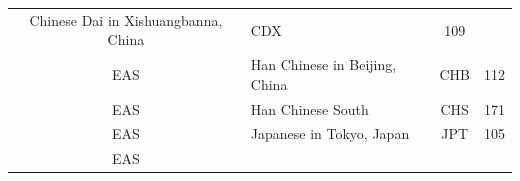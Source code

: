 \documentclass[]{book}
\theoremstyle{definition}
\theoremstyle{definition}
\theoremstyle{definition}
\theoremstyle{remark}
\begin{document}
\begin{longtable}[]{@{}clcc@{}}
\begin{minipage}[t]{0.59\columnwidth}
Chinese Dai in Xishuangbanna, China\strut
\end{minipage} & \begin{minipage}[t]{0.09\columnwidth}\centering\strut
CDX\strut
\end{minipage} & \begin{minipage}[t]{0.07\columnwidth}\centering\strut
109\strut
\end{minipage}\tabularnewline
\begin{minipage}[t]{0.14\columnwidth}\centering\strut
EAS\strut
\end{minipage} & \begin{minipage}[t]{0.59\columnwidth}\raggedright\strut
Han Chinese in Beijing, China\strut
\end{minipage} & \begin{minipage}[t]{0.09\columnwidth}\centering\strut
CHB\strut
\end{minipage} & \begin{minipage}[t]{0.07\columnwidth}\centering\strut
112\strut
\end{minipage}\tabularnewline
\begin{minipage}[t]{0.14\columnwidth}\centering\strut
EAS\strut
\end{minipage} & \begin{minipage}[t]{0.59\columnwidth}\raggedright\strut
Han Chinese South\strut
\end{minipage} & \begin{minipage}[t]{0.09\columnwidth}\centering\strut
CHS\strut
\end{minipage} & \begin{minipage}[t]{0.07\columnwidth}\centering\strut
171\strut
\end{minipage}\tabularnewline
\begin{minipage}[t]{0.14\columnwidth}\centering\strut
EAS\strut
\end{minipage} & \begin{minipage}[t]{0.59\columnwidth}\raggedright\strut
Japanese in Tokyo, Japan\strut
\end{minipage} & \begin{minipage}[t]{0.09\columnwidth}\centering\strut
JPT\strut
\end{minipage} & \begin{minipage}[t]{0.07\columnwidth}\centering\strut
105\strut
\end{minipage}\tabularnewline
\begin{minipage}[t]{0.14\columnwidth}\centering\strut
EAS\strut
\end{minipage} & \begin{minipage}[t]{0.59\columnwidth}\raggedright\strut

\end{minipage}
\end{longtable}
\end{document}
